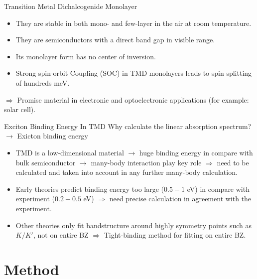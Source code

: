 \documentclass{beamer}
\begin{document}
	\begin{frame}{Transition Metal Dichalcogenide Monolayer}
		\begin{itemize}
			\item They are stable in both mono- and few-layer in the air at room temperature. \\
			\item They are semiconductors with a direct band gap in visible range.
			\item Its monolayer form has no center of inversion.\\
			\item Strong spin-orbit Coupling (SOC) in TMD monolayers leads to spin splitting of hundreds meV.
		\end{itemize}
		$\Rightarrow$ Promise material in electronic and optoelectronic applications (for example: solar cell).
	\end{frame}
	\begin{frame}{Exciton Binding Energy In TMD}
		Why calculate the linear absorption spectrum?\\ $\to$ Exicton binding energy
		\begin{itemize}
			\item TMD is a low-dimensional material $\to$ huge binding energy in compare with bulk semiconductor $\to$ many-body interaction play key role $\Rightarrow$ need to be calculated and taken into account in any further many-body calculation.
			\item Early theories predict binding energy too large ($0.5-1$ eV) in compare with experiment ($0.2-0.5$ eV) $\Rightarrow$ need precise calculation in agreement with the experiment.
			\item Other theories only fit bandstructure around highly symmetry points such as $K/K'$, not on entire BZ $\Rightarrow$ Tight-binding method for fitting on entire BZ.
		\end{itemize}
	\end{frame}
	\section{Method}
\end{document}
